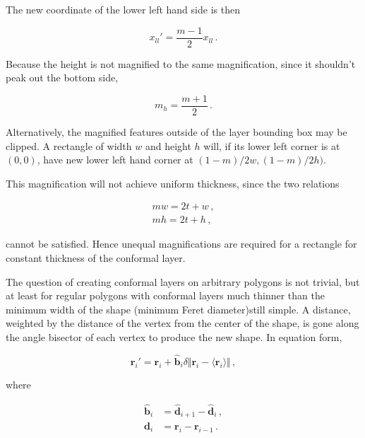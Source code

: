 \documentclass{article}
\begin{document}
The new coordinate of the lower left hand side is then 

$$x_{ll}' = \frac{m-1}{2} x_{ll} \,. $$

Because the height is not magnified to the same magnification, since it shouldn't peak out the bottom side,

$$m_h = \frac{m+1}{2} \,. $$

Alternatively, the magnified features outside of the layer bounding box may be clipped. A rectangle of width $w$ and height $h$ will, if its lower left corner is at $(0,0)$, have new lower left hand corner at $(1-m)/2 w, (1-m)/2 h)$.

This magnification will not achieve uniform thickness, since the two relations

\begin{align*}
    mw = 2t + w \,,\\
    mh = 2t + h \,,
\end{align*}

cannot be satisfied. Hence unequal magnifications are required for a rectangle for constant thickness of the conformal layer. 

The question of creating conformal layers on arbitrary polygons is not trivial, but at least for regular polygons with conformal layers much thinner than the minimum width of the shape (minimum Feret diameter)still simple. A distance, weighted by the distance of the vertex from the center of the shape, is gone along the angle bisector of each vertex to produce the new shape. In equation form,

$$\mathbf{r}_i' = \mathbf{r}_i + \hat{\mathbf{b}}_i \delta \Vert \mathbf{r}_i - \langle \mathbf{r}_i \rangle \Vert \,, $$

where

\begin{align*}
\hat{\mathbf{b}}_i &= \hat{\mathbf{d}}_{i+1} - \hat{\mathbf{d}}_{i}\,, \\
\mathbf{d}_i &= \mathbf{r}_i - \mathbf{r}_{i-1} \,.
\end{align*}
\end{document}
